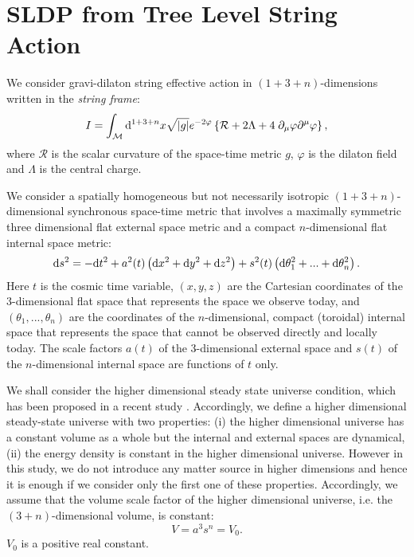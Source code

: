 \documentclass[11pt,a4paper]{article}
\begin{document}
\section{SLDP from Tree Level String Action}
We consider gravi-dilaton string effective action in $(1+3+n)$-dimensions written in the {\sl string frame}:
\begin{equation}
\label{eqn:action}
I = \int_{\mathcal{M}} {\rm d}^{1+3+n}x \sqrt{|g|} e^{-2 \varphi} \left \{ \mathcal{R}+2\Lambda+ 4\; \partial_{\mu} \varphi \partial^{\mu} \varphi \right \},
\end{equation}
where $\mathcal{R}$ is the scalar curvature of the space-time metric $g$, $\varphi$ is the dilaton field and  $\Lambda$ is the central charge.

We consider a spatially homogeneous but not necessarily isotropic $(1+3+n)$-dimensional synchronous space-time metric that involves a maximally symmetric three dimensional flat external space metric and a compact $n$-dimensional flat internal space metric:
\begin{equation}
\label{eqn:HDmetric}
{\rm d}s^2 = -{\rm d}t^2 + a^2(t) \left ( {\rm d}x^2 + {\rm d}y^2 +{\rm d}z^2 \right ) + s^2(t)
\left ( {\rm d}\theta_{1}^{2} +...+  {\rm d}\theta_{n}^{2}\right ).
\end{equation}
Here $t$ is the cosmic time variable, $(x,y,z)$ are the Cartesian coordinates of the 3-dimensional flat space that represents the space we observe today, and $(\theta_1, ...,\theta_n)$ are the coordinates of the $n$-dimensional, compact (toroidal) internal space that represents the space that cannot be observed directly and locally today. The scale factors $a(t)$ of the 3-dimensional external space and $s(t)$ of the $n$-dimensional internal space are functions of $t$ only.

We shall consider the higher dimensional steady state universe condition, which has been proposed in a recent study \cite{AkarsuDereli12HDSS}. Accordingly, we define a higher dimensional steady-state universe with two properties: (i) the higher dimensional universe has a constant volume as a whole but the internal and external spaces are dynamical, (ii) the energy density is constant in the higher dimensional universe. However in this study, we do not introduce any matter source in higher dimensions and hence it is enough if we consider only the first one of these properties. Accordingly, we assume that the volume scale factor of the higher dimensional universe, i.e. the $(3+n)$-dimensional volume, is constant:
\begin{equation}
\label{eqn:constvol}
V=a^{3}s^{n}=V_{0}.
\end{equation}
$V_{0}$ is a positive real constant.
\end{document}
